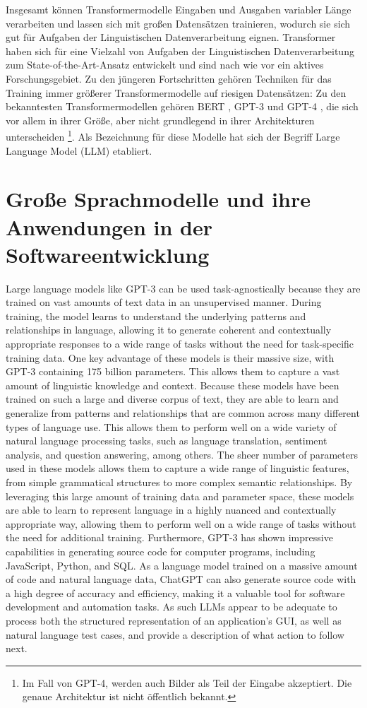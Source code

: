 Insgesamt können Transformermodelle Eingaben und Ausgaben variabler Länge verarbeiten und lassen sich mit großen Datensätzen trainieren, wodurch sie sich gut für Aufgaben der Linguistischen Datenverarbeitung eignen.
Transformer haben sich für eine Vielzahl von Aufgaben der Linguistischen Datenverarbeitung zum State-of-the-Art-Ansatz entwickelt und sind nach wie vor ein aktives Forschungsgebiet.
Zu den jüngeren Fortschritten gehören Techniken für das Training immer größerer Transformermodelle auf riesigen Datensätzen:
Zu den bekanntesten Transformermodellen gehören BERT \cite{bert}, GPT-3 \cite{FewShotLearners} und GPT-4 \cite{gpt4}, die sich vor allem in ihrer Größe, aber nicht grundlegend in ihrer Architekturen unterscheiden \footnote{Im Fall von GPT-4, werden auch Bilder als Teil der Eingabe akzeptiert. Die genaue Architektur ist nicht öffentlich bekannt.}.
Als Bezeichnung für diese Modelle hat sich der Begriff Large Language Model (LLM) etabliert.

\section{Große Sprachmodelle und ihre Anwendungen in der Softwareentwicklung}
\label{subsec:Foundations:LLM}

Large language models like GPT-3 can be used task-agnostically because they are trained on vast amounts of text data in an unsupervised manner. During training, the model learns to understand the underlying patterns and relationships in language, allowing it to generate coherent and contextually appropriate responses to a wide range of tasks without the need for task-specific training data.
One key advantage of these models is their massive size, with GPT-3 containing 175 billion parameters.
This allows them to capture a vast amount of linguistic knowledge and context.
Because these models have been trained on such a large and diverse corpus of text, they are able to learn and generalize from patterns and relationships that are common across many different types of language use. This allows them to perform well on a wide variety of natural language processing tasks, such as language translation, sentiment analysis, and question answering, among others.
The sheer number of parameters used in these models allows them to capture a wide range of linguistic features, from simple grammatical structures to more complex semantic relationships. By leveraging this large amount of training data and parameter space, these models are able to learn to represent language in a highly nuanced and contextually appropriate way, allowing them to perform well on a wide range of tasks without the need for additional training.
Furthermore, GPT-3 has shown impressive capabilities in generating source code for computer programs, including JavaScript, Python, and SQL. As a language model trained on a massive amount of code and natural language data, ChatGPT can also generate source code with a high degree of accuracy and efficiency, making it a valuable tool for software development and automation tasks.
As such LLMs appear to be adequate to process both the structured representation of an application’s GUI, as well as natural language test cases, and provide a description of what action to follow next.


